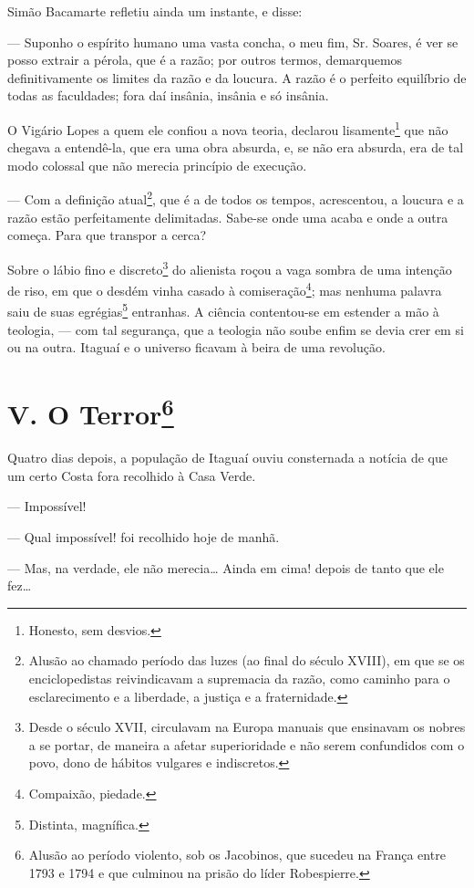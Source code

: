 Simão Bacamarte refletiu ainda um instante, e disse:

--- Suponho o espírito humano uma vasta concha, o meu fim, Sr. Soares, é
ver se posso extrair a pérola, que é a razão; por outros termos,
demarquemos definitivamente os limites da razão e da loucura. A razão é
o perfeito equilíbrio de todas as faculdades; fora daí insânia, insânia
e só insânia.

O Vigário Lopes a quem ele confiou a nova teoria, declarou
lisamente\footnote{Honesto, sem desvios.} que não chegava a entendê-la,
que era uma obra absurda, e, se não era absurda, era de tal modo
colossal que não merecia princípio de execução.

--- Com a definição atual\footnote{Alusão ao chamado período das luzes
  (ao final do século XVIII), em que se os enciclopedistas reivindicavam
  a supremacia da razão, como caminho para o esclarecimento e a
  liberdade, a justiça e a fraternidade.}, que é a de todos os tempos,
acrescentou, a loucura e a razão estão perfeitamente delimitadas.
Sabe-se onde uma acaba e onde a outra começa. Para que transpor a cerca?

Sobre o lábio fino e discreto\footnote{Desde o século XVII, circulavam
  na Europa manuais que ensinavam os nobres a se portar, de maneira a
  afetar superioridade e não serem confundidos com o povo, dono de
  hábitos vulgares e indiscretos.} do alienista roçou a vaga sombra de
uma intenção de riso, em que o desdém vinha casado à
comiseração\footnote{Compaixão, piedade.}; mas nenhuma palavra saiu de
suas egrégias\footnote{Distinta, magnífica.} entranhas. A ciência
contentou-se em estender a mão à teologia, --- com tal segurança, que a
teologia não soube enfim se devia crer em si ou na outra. Itaguaí e o
universo ficavam à beira de uma revolução.

\chapter{V. O Terror\footnote{Alusão ao período violento, sob os Jacobinos,
  que sucedeu na França entre 1793 e 1794 e que culminou na prisão do
  líder Robespierre.}}

Quatro dias depois, a população de Itaguaí ouviu consternada a notícia
de que um certo Costa fora recolhido à Casa Verde.

--- Impossível!

--- Qual impossível! foi recolhido hoje de manhã.

--- Mas, na verdade, ele não merecia\ldots{} Ainda em cima! depois de
tanto que ele fez\ldots{}

